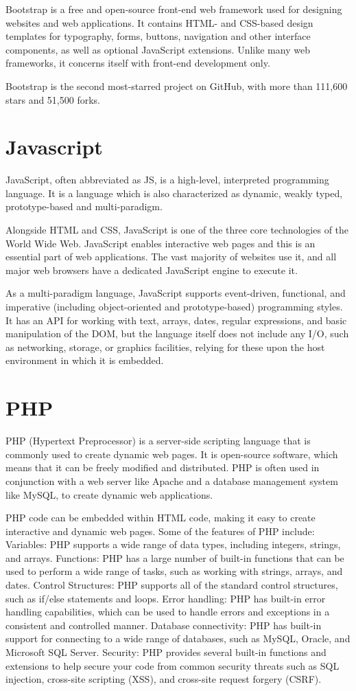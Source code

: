 Bootstrap is a free and open-source front-end web framework used for  designing websites and web applications. It contains HTML- and CSS-based design templates for typography, forms, buttons, navigation and other interface components, as well as optional JavaScript extensions. Unlike many web frameworks, it concerns itself with front-end development only.

Bootstrap is the second most-starred project on GitHub, with more than 111,600 stars and 51,500 forks.
\section{Javascript}
JavaScript, often abbreviated as JS, is a high-level, interpreted programming language. It is a language which is also characterized as dynamic, weakly typed, prototype-based and multi-paradigm.

Alongside HTML and CSS, JavaScript is one of the three core technologies of the World Wide Web. JavaScript enables interactive web pages and this is an essential part of web applications. The vast majority of websites use it, and all major web browsers have a dedicated JavaScript engine to execute it.

As a multi-paradigm language, JavaScript supports event-driven, functional, and imperative (including object-oriented and prototype-based) programming styles. It has an API for working with text, arrays, dates, regular expressions, and basic manipulation of the DOM, but the language itself does not include any I/O, such as networking, storage, or graphics facilities, relying for these upon the host environment in which it is embedded.
\section{PHP}
PHP (Hypertext Preprocessor) is a server-side scripting language that is commonly used to create dynamic web pages. It is open-source software, which means that it can be freely modified and distributed. PHP is often used in conjunction with a web server like Apache and a database management system like MySQL, to create dynamic web applications.

PHP code can be embedded within HTML code, making it easy to create interactive and dynamic web pages. Some of the features of PHP include:
Variables: PHP supports a wide range of data types, including integers, strings, and arrays.
Functions: PHP has a large number of built-in functions that can be used to perform a wide range of tasks, such as working with strings, arrays, and dates.
Control Structures: PHP supports all of the standard control structures, such as if/else statements and loops.
Error handling: PHP has built-in error handling capabilities, which can be used to handle errors and exceptions in a consistent and controlled manner.
Database connectivity: PHP has built-in support for connecting to a wide range of databases, such as MySQL, Oracle, and Microsoft SQL Server.
Security: PHP provides several built-in functions and extensions to help secure your code from common security threats such as SQL injection, cross-site scripting (XSS), and cross-site request forgery (CSRF).

